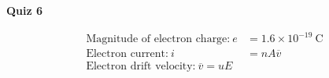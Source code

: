 \documentclass{article}
\begin{document}
\fancyfoot[C]{\thepage}
\vspace*{0cm}
\begin{center}
	{\LARGE \textbf{Quiz 6}}\\
	\vspace{0.25cm}
	\vspace{0.25cm}
\end{center}
\begin{align*}
	\text{Magnitude of electron charge:}\ e&=1.6\times10^{-19}\ \mathrm{C}\\
	\text{Electron current:}\ i&=nA\overline{v}\\
	\text{Electron drift velocity:}\ \overline{v}=uE\\
\end{align*}
\end{document}
